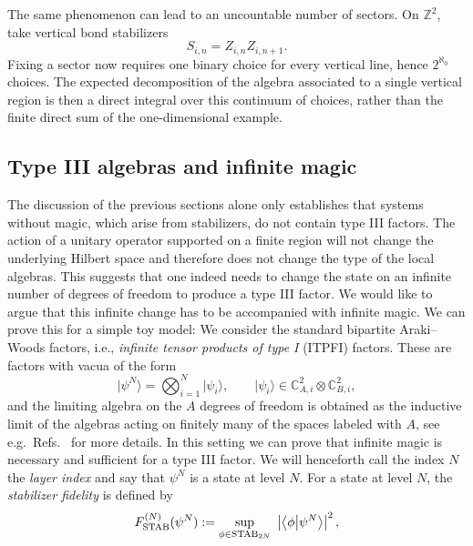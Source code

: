 \documentclass[aps,pra,reprint,superscriptaddress]{revtex4-2}
\newcommand{\bbC}{\mathbb C}
\providecommand{\ket}[1]{\lvert #1\rangle}
\theoremstyle{definition}
\theoremstyle{remark}
\begin{document}
The same phenomenon can lead to an uncountable number of sectors.  On $\mathbb Z^2$,
take vertical bond stabilizers
\begin{equation}
 S_{i,n}=Z_{i,n}Z_{i,n+1}.
\end{equation}
%
Fixing a sector now requires one binary choice for every vertical line, hence
$2^{\aleph_0}$ choices. The expected decomposition of the algebra associated
to a single vertical region is then a direct integral over this continuum of
choices, rather than the finite direct sum of the one-dimensional example.
 
\subsection{Type III algebras and infinite magic}\label{sec:infinite-magic-implies-type-III}
The discussion of the previous sections alone only establishes that systems without magic, which arise from stabilizers, do not contain type III factors. The action of a unitary operator supported on a finite region will not change the underlying Hilbert space and therefore does not change the type of the local algebras. This suggests that one indeed needs to change the state on an infinite number of degrees of freedom to produce a type III factor. We would like to argue that this infinite change has to be accompanied with infinite magic. We can prove this for a simple toy model:
We consider the standard bipartite Araki--Woods factors, i.e., \emph{infinite tensor products of type I} (ITPFI) factors.
These are factors with vacua of the form
\begin{equation}
  \ket{\psi^N}=\bigotimes_{i=1}^{N}\ket{\psi_i},
  \qquad
  \ket{\psi_i}\in\bbC^2_{A,i}\otimes\bbC^2_{B,i},
\end{equation}
and the limiting algebra on the $A$ degrees of freedom is obtained as the
inductive limit of the algebras acting on finitely many of the spaces labeled
with $A$, see e.g.\ Refs.~\cite{vonNeumann1939,ArakiWoods1968,Witten:2018zxz} for more details. In this setting we can prove that infinite magic
is necessary and sufficient for a type III factor. We will henceforth call the index $N$ the \emph{layer index} and say that $\psi^N$ is a state at level $N$.
For a state at level $N$, 
the \emph{stabilizer fidelity} \cite{Bravyi:2018ugg} is defined by
\begin{equation}\label{eq:stabilizer_fidelity}
    F_{\mathrm{STAB}}^{(N)}(\psi^N)
 := \sup_{\phi\in\mathrm{STAB}_{2N}}\
 \left|\braket{\phi}{\psi^N}\right|^2 , 
\end{equation}
\end{document}
